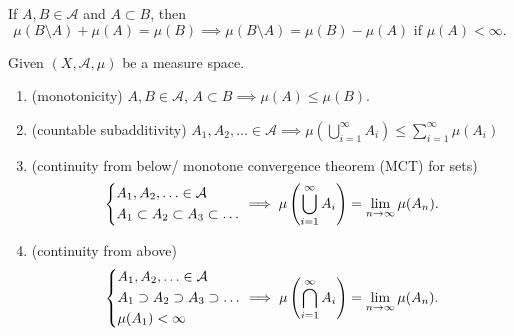 \begin{note}
	If \(A, B\in \mathcal{A} \) and \(A\subset B\), then
	\[
		\mu(B\setminus A) + \mu(A) = \mu(B) \implies \mu(B \setminus A) = \mu(B) - \mu(A) \text{ if }\mu(A)<\infty.
	\]
\end{note}

\begin{theorem}\label{thm:measure-space}
	Given \((X, \mathcal{A} , \mu)\) be a measure space.
	\begin{enumerate}
		\item \label{thm:measure-space-monotonicity}(monotonicity) \(A, B\in \mathcal{A} \), \(A\subset B \implies \mu(A)\leq \mu(B)\).
		\item (countable subadditivity) \(A_1, A_2, \ldots \in \mathcal{A} \implies \mu\left(\bigcup\limits_{i=1}^{\infty} A_{i}\right) \leq \sum\limits_{i=1}^{\infty} \mu(A_{i})\)
		\item \label{thm:measure-space-continuity-from-below}(continuity from below/ monotone convergence theorem (MCT) for sets)
		      \[
			      \begin{dcases}
				      A_1, A_2, \ldots \in \mathcal{A} \\
				      A_1\subset A_2\subset A_3\subset \ldots
			      \end{dcases} \implies \mu\left(\bigcup\limits_{i=1}^{\infty} A_{i}\right) = \lim\limits_{n \to \infty} \mu(A_{n}).
		      \]
		\item \label{thm:measure-space-continuity-from-above}(continuity from above)
		      \[
			      \begin{dcases}
				      A_1, A_2, \ldots \in \mathcal{A}        \\
				      A_1\supset A_2\supset A_3\supset \ldots \\
				      \mu(A_1) < \infty
			      \end{dcases} \implies \mu\left(\bigcap\limits_{i=1}^{\infty} A_{i}\right) = \lim\limits_{n \to \infty} \mu(A_{n}).
		      \]
	\end{enumerate}
\end{theorem}
